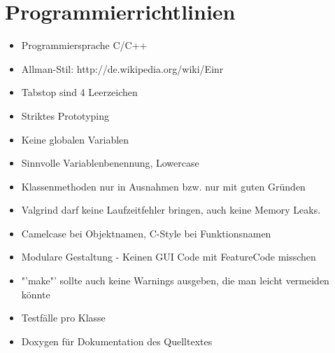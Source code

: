 \chapter{Programmierrichtlinien}

\renewcommand{\labelitemi}{•}
\begin{itemize}
	\item Programmiersprache C/C++
	\item Allman-Stil: http://de.wikipedia.org/wiki/Einr%
	\item Tabstop sind 4 Leerzeichen
	\item Striktes Prototyping
	\item Keine globalen Variablen
	\item Sinnvolle Variablenbenennung, Lowercase
	\item Klassenmethoden nur in Ausnahmen bzw. nur mit guten Gründen
	\item Valgrind darf keine Laufzeitfehler bringen, auch keine Memory Leaks.
	\item Camelcase bei Objektnamen, C-Style bei Funktionsnamen
	\item Modulare Gestaltung - Keinen GUI Code mit FeatureCode misschen
	\item "'make"' sollte auch keine Warnings ausgeben, die man leicht vermeiden 
könnte
	\item Testfälle pro Klasse 
	\item Doxygen für Dokumentation des Quelltextes
\end{itemize}
